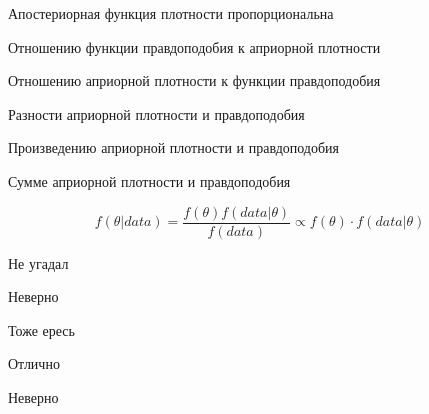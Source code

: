
\begin{question}
Апостериорная функция плотности пропорциональна
\begin{answerlist}
  \item Отношению функции правдоподобия к априорной плотности
  \item Отношению априорной плотности к функции правдоподобия
  \item Разности априорной плотности и правдоподобия
  \item Произведению априорной плотности и правдоподобия
  \item Сумме априорной плотности и правдоподобия
\end{answerlist}
\end{question}

\begin{solution}
\[
f(\theta|data) = \frac{f(\theta)f(data|\theta)}{f(data)}\propto f(\theta) \cdot f(data|\theta)
\]
\begin{answerlist}
  \item Не угадал
  \item Неверно
  \item Тоже ересь
  \item Отлично
  \item Неверно
\end{answerlist}
\end{solution}

